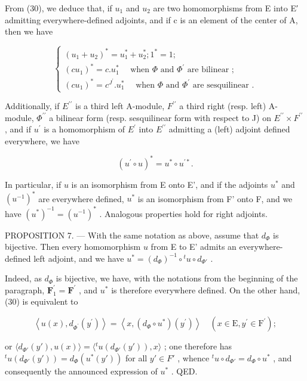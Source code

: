 From (30), we deduce that, if \(u_1\) and \(u_2\) are two homomorphisms from E into E′ admitting everywhere-defined adjoints, and if c is an element of the center of A, then we have

\[
\left\{ \begin{array}{l} (u _ {1} + u _ {2}) ^ {*} = u _ {1} ^ {*} + u _ {2} ^ {*}; 1 ^ {*} = 1; \\ (c u _ {1}) ^ {*} = c. u _ {1} ^ {*} \quad \text { when } \Phi \text { and } \Phi^ {\prime} \text { are bilinear }; \\ (c u _ {1}) ^ {*} = c ^ {J ^ {\prime}}. u _ {1} ^ {*} \quad \text { when } \Phi \text { and } \Phi^ {\prime} \text { are sesquilinear }. \end{array} \right.\tag{32}
\]

Additionally, if \(E^{\prime\prime}\) is a third left A-module, \(F^{\prime\prime}\) a third right (resp. left) A-module, \(\Phi^{\prime\prime}\) a bilinear form (resp. sesquilinear form with respect to J) on \(E^{\prime\prime} \times F^{\prime\prime}\) , and if \(u^{\prime}\) is a homomorphism of \(E^{\prime}\) into \(E^{\prime\prime}\) admitting a (left) adjoint defined everywhere, we have

\[
(u ^ {\prime} \circ u) ^ {*} = u ^ {*} \circ u ^ {\prime *}.\tag{33}
\]

In particular, if \(u\) is an isomorphism from E onto E', and if the adjoints \(u^{*}\) and \((u^{-1})^{*}\) are everywhere defined, \(u^{*}\) is an isomorphism from F' onto F, and we have \((u^{*})^{-1} = (u^{-1})^{*}\) . Analogous properties hold for right adjoints.

PROPOSITION 7. --- With the same notation as above, assume that \(d_{\Phi}\) is bijective. Then every homomorphism \(u\) from E to E' admits an everywhere-defined left adjoint, and we have \(u^{*} = (d_{\Phi})^{-1} \circ {}^{t}u \circ d_{\Phi'}\) .

Indeed, as \(d_{\Phi}\) is bijective, we have, with the notations from the beginning of the paragraph, \(\mathbf{F}_{1}^{\prime}=\mathbf{F}^{\prime}\) , and \(u^{*}\) is therefore everywhere defined. On the other hand, (30) is equivalent to

\[
\left\langle u (x), d _ {\Phi^ {\prime}} \left(y ^ {\prime}\right) \right\rangle = \left\langle x, \left(d _ {\Phi} \circ u ^ {*}\right) \left(y ^ {\prime}\right) \right\rangle \quad \left(x \in \mathrm{E}, y ^ {\prime} \in \mathrm{F} ^ {\prime}\right);
\]

or \(\langle d_{\Phi'}(y'), u(x) \rangle = \langle {}^t u(d_{\Phi'}(y')), x \rangle\) ; one therefore has \({}^t u(d_{\Phi'}(y')) = d_{\Phi}(u^*(y'))\) for all \(y' \in F'\) , whence \({}^t u \circ d_{\Phi'} = d_{\Phi} \circ u^*\) , and consequently the announced expression of \(u^*\) . QED.


